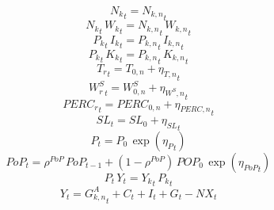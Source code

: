 \noindent[name= `aggergate sector labour']
\begin{dmath}
{{N_k}}_{t}={{N_{k,n}}}_{t}
\end{dmath}
\noindent[name= `aggergate sector labour']
\begin{dmath}
{{N_k}}_{t}\, {{W_k}}_{t}={{N_{k,n}}}_{t}\, {{W_{k,n}}}_{t}
\end{dmath}
\noindent[name= `aggregate sector investment']
\begin{dmath}
{{P_k}}_{t}\, {{I_k}}_{t}={{P_{k,n}}}_{t}\, {{I_{k,n}}}_{t}
\end{dmath}
\noindent[name= `aggregate capital']
\begin{dmath}
{{P_k}}_{t}\, {{K_k}}_{t}={{P_{k,n}}}_{t}\, {{K_{k,n}}}_{t}
\end{dmath}
\noindent[name= `Temperature']
\begin{dmath}
{{T_{r}}}_{t}={{T_{0,n}}}+{{\eta_{T,n}}}_{t}
\end{dmath}
\noindent[name= `Wind speed']
\begin{dmath}
{{W_{r}^{S}}}_{t}={{W^{S}_{0,n}}}+{{\eta_{W^{S},n}}}_{t}
\end{dmath}
\noindent[name= `Percipitation']
\begin{dmath}
{{PERC_{r}}}_{t}={{PERC_{0,n}}}+{{\eta_{PERC,n}}}_{t}
\end{dmath}
\noindent[name= `Sea level']
\begin{dmath}
{{SL}}_{t}={{SL_0}}+{{\eta_{SL}}}_{t}
\end{dmath}
\noindent[name= `national price level']
\begin{dmath}
{P}_{t}={{P_0}}\, \exp\left({{\eta_{P}}}_{t}\right)
\end{dmath}
\noindent[name= `Population']
\begin{dmath}
{PoP}_{t}={{\rho^{PoP}}}\, {PoP}_{t-1}+\left(1-{{\rho^{PoP}}}\right)\, {{POP_0}}\, \exp\left({{\eta_{PoP}}}_{t}\right)
\end{dmath}
\noindent[name= `aggregate gross value added']
\begin{dmath}
{P}_{t}\, {Y}_{t}={{Y_k}}_{t}\, {{P_k}}_{t}
\end{dmath}
\noindent[name= `Resource Constraint']
\begin{dmath}
{Y}_{t}={{G^{A}_{k,n}}}_{t}+{C}_{t}+{I}_{t}+{G}_{t}-{NX}_{t}
\end{dmath}
\noindent[name= `Net Exports']
